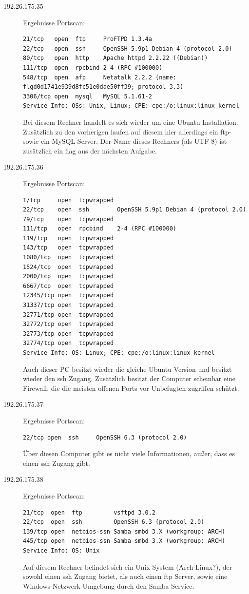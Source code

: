 \documentclass[10pt,a4paper]{article}
\begin{document}
\begin{description}
\item[192.26.175.35] Ergebnisse Portscan:
\begin{verbatim}
21/tcp   open  ftp     ProFTPD 1.3.4a
22/tcp   open  ssh     OpenSSH 5.9p1 Debian 4 (protocol 2.0)
80/tcp   open  http    Apache httpd 2.2.22 ((Debian))
111/tcp  open  rpcbind 2-4 (RPC #100000)
548/tcp  open  afp     Netatalk 2.2.2 (name: flgd0d1741e939d8fc51e0dae50ff39; protocol 3.3)
3306/tcp open  mysql   MySQL 5.1.61-2
Service Info: OSs: Unix, Linux; CPE: cpe:/o:linux:linux_kernel
\end{verbatim}
Bei diesem Rechner handelt es sich wieder um eine Ubuntu Installation. Zusätzlich zu den vorherigen laufen auf diesem hier allerdings ein ftp- sowie ein MySQL-Server. Der Name dieses Rechners (als UTF-8) ist zusätzlich ein flag aus der nächsten Aufgabe.

\item[192.26.175.36] Ergebnisse Portscan:
\begin{verbatim}
1/tcp     open  tcpwrapped
22/tcp    open  ssh        OpenSSH 5.9p1 Debian 4 (protocol 2.0)
79/tcp    open  tcpwrapped
111/tcp   open  rpcbind    2-4 (RPC #100000)
119/tcp   open  tcpwrapped
143/tcp   open  tcpwrapped
1080/tcp  open  tcpwrapped
1524/tcp  open  tcpwrapped
2000/tcp  open  tcpwrapped
6667/tcp  open  tcpwrapped
12345/tcp open  tcpwrapped
31337/tcp open  tcpwrapped
32771/tcp open  tcpwrapped
32772/tcp open  tcpwrapped
32773/tcp open  tcpwrapped
32774/tcp open  tcpwrapped
Service Info: OS: Linux; CPE: cpe:/o:linux:linux_kernel
\end{verbatim}
Auch dieser PC besitzt wieder die gleiche Ubuntu Version und besitzt wieder den ssh Zugang. Zusätzlich besitzt der Computer scheinbar eine Firewall, die die meisten offenen Ports vor Unbefugten zugriffen schützt.

\item[192.26.175.37] Ergebnisse Portscan:
\begin{verbatim}
22/tcp open  ssh     OpenSSH 6.3 (protocol 2.0)
\end{verbatim}
Über diesen Computer gibt es nicht viele Informationen, außer, dass es einen ssh Zugang gibt.

\item[192.26.175.38] Ergebnisse Portscan:
\begin{verbatim}
21/tcp  open  ftp         vsftpd 3.0.2
22/tcp  open  ssh         OpenSSH 6.3 (protocol 2.0)
139/tcp open  netbios-ssn Samba smbd 3.X (workgroup: ARCH)
445/tcp open  netbios-ssn Samba smbd 3.X (workgroup: ARCH)
Service Info: OS: Unix
\end{verbatim}
Auf diesem Rechner befindet sich ein Unix System (Arch-Linux?), der sowohl einen ssh Zugang bietet, als auch einen ftp Server, sowie eine Windows-Netzwerk Umgebung durch den Samba Service.


\end{description}
\end{document}
